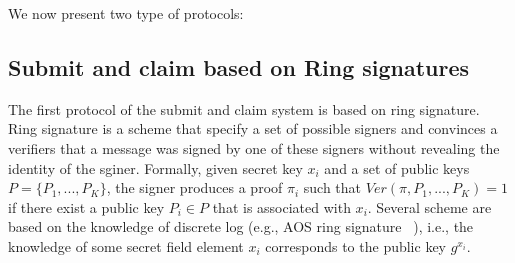 \documentclass[]{article}
\newcommand\getr{\stackrel{\mathclap{\normalfont\mbox{\tiny R}}}{\gets}}
\begin{document}
		
		
		
		We now present two type of protocols:
		\subsection{Submit and claim based on Ring signatures}
		The first protocol of the submit and claim system is based on ring signature. Ring signature is a scheme that specify a set of possible signers and convinces a verifiers  that a message was signed by one of these signers without revealing the identity of the sginer. Formally, given secret key $x_i$ and a set of public keys $P=\{P_1,...,P_K\}$, the signer produces a proof $\pi_i$ such that $Ver(\pi, P_1,...,P_K)=1$ if there exist a public key $P_i\in P$ that is associated with $x_i$. 	Several scheme are based on the knowledge of discrete log 	(e.g.,  AOS ring signature ~\cite{abe20041}), i.e., the knowledge of some secret field element $x_i$ corresponds to the public key $g^{x_i}$. 
		
\end{document}
